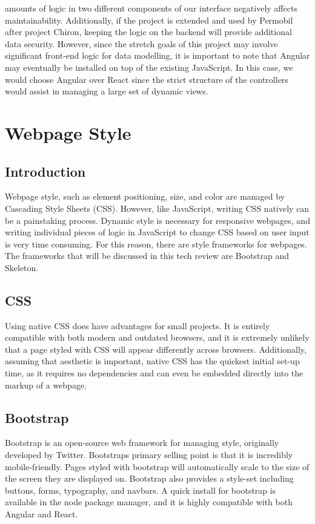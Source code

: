 \documentclass[onecolumn, draftclsnofoot,10pt, compsoc]{report}
\begin{document}
amounts of logic in two different components of our interface negatively affects maintainability. Additionally, if the
project is extended and used by Permobil after project Chiron, keeping the logic on the backend will provide additional
data security. However, since the stretch goals of this project may involve significant front-end logic for data modelling,
it is important to note that Angular may eventually be installed on top of the existing JavaScript. In this case, we would
choose Angular over React since the strict structure of the controllers would assist in managing a large set of dynamic
views.

\section{Webpage Style}
\subsection{Introduction}
Webpage style, such as element positioning, size, and color are managed by Cascading Style Sheets (CSS). However,
like JavaScript, writing CSS natively can be a painstaking process. Dynamic style is necessary for responsive webpages,
and writing individual pieces of logic in JavaScript to change CSS based on user input is very time consuming. For
this reason, there are style frameworks for webpages. The frameworks that will be discussed in this tech review are
Bootstrap and Skeleton.
\subsection{CSS}
Using native CSS does have advantages for small projects. It is entirely compatible with both modern and outdated
browsers, and it is extremely unlikely that a page styled with CSS will appear differently across browsers. Additionally,
assuming that aesthetic is important, native CSS has the quickest initial set-up time, as it requires no dependencies and
can even be embedded directly into the markup of a webpage.
\subsection{Bootstrap}
Bootstrap is an open-source web framework for managing style, originally developed by Twitter. Bootstraps primary
selling point is that it is incredibly mobile-friendly. Pages styled with bootstrap will automatically scale to the size of the
screen they are displayed on. Bootstrap also provides a style-set including buttons, forms, typography, and navbars. A
quick install for bootstrap is available in the node package manager, and it is highly compatible with both Angular and
React.
\end{document}
